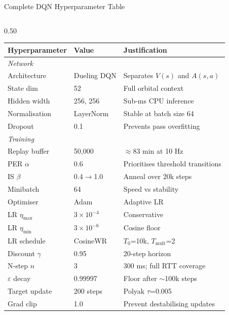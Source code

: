 \documentclass[aspectratio=169,10pt]{beamer}
\begin{document}
\begin{frame}[shrink=12]{Complete DQN Hyperparameter Table}
  \begin{columns}[T]
    \begin{column}{0.50\textwidth}
      {\scriptsize
      \begin{tabular}{p{3.0cm}p{1.5cm}p{3.2cm}}
        \toprule
        \textbf{Hyperparameter} & \textbf{Value} & \textbf{Justification}\\
        \midrule
        \multicolumn{3}{l}{\textit{Network}}\\
        Architecture   & Dueling DQN   & Separates $V(s)$ and $A(s,a)$\\
        State dim      & 52            & Full orbital context\\
        Hidden width   & 256, 256      & Sub-ms CPU inference\\
        Normalisation  & LayerNorm     & Stable at batch size 64\\
        Dropout        & 0.1           & Prevents pass overfitting\\
        \midrule
        \multicolumn{3}{l}{\textit{Training}}\\
        Replay buffer  & 50,000        & $\approx$83 min at 10 Hz\\
        PER $\alpha$   & 0.6           & Prioritises threshold transitions\\
        IS $\beta$     & 0.4$\to$1.0  & Anneal over 20k steps\\
        Minibatch      & 64            & Speed vs stability\\
        Optimiser      & Adam          & Adaptive LR\\
        LR $\eta_\text{max}$ & $3\times10^{-4}$ & Conservative\\
        LR $\eta_\text{min}$ & $3\times10^{-6}$ & Cosine floor\\
        LR schedule    & CosineWR      & $T_0$=10k, $T_\text{mult}$=2\\
        Discount $\gamma$ & 0.95       & 20-step horizon\\
        N-step $n$     & 3             & 300 ms; full RTT coverage\\
        $\varepsilon$ decay & 0.99997 & Floor after $\sim$100k steps\\
        Target update  & 200 steps     & Polyak $\tau$=0.005\\
        Grad clip      & 1.0           & Prevent destabilising updates\\

\end{tabular}}
\end{column}
\end{columns}
\end{frame}
\end{document}
